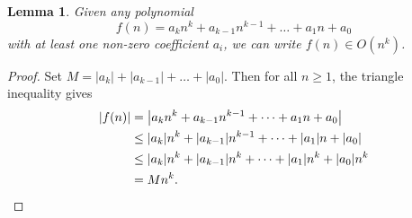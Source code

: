 \documentclass[10pt]{article}
\newtheorem*{lemma}{Lemma}
\begin{document}
    \begin{lemma}
        Given any polynomial \[
            f(n) = a_kn^k + a_{k - 1}n^{k - 1} + \dots + a_1n + a_0
        \] with at least one non-zero coefficient $a_i$, we can write $f(n) \in
        O(n^k)$.
    \end{lemma}
    \begin{proof}
        Set $M = |a_k| + |a_{k - 1}| + \dots + |a_0|$. Then for all $n \geq 1$, the
        triangle inequality gives
        \begin{align*}
            |f(n)| &= \left|a_kn^k + a_{k - 1}n^{k - 1} + \dots + a_1n + a_0\right|
            \\
            &\leq |a_k|n^k + |a_{k - 1}|n^{k - 1} + \dots + |a_1|n + |a_0| \\
            &\leq |a_k|n^k + |a_{k - 1}|n^k + \dots + |a_1|n^k + |a_0|n^k \\
            &= M n^k. \qedhere
        \end{align*}
    \end{proof}
\end{document}
